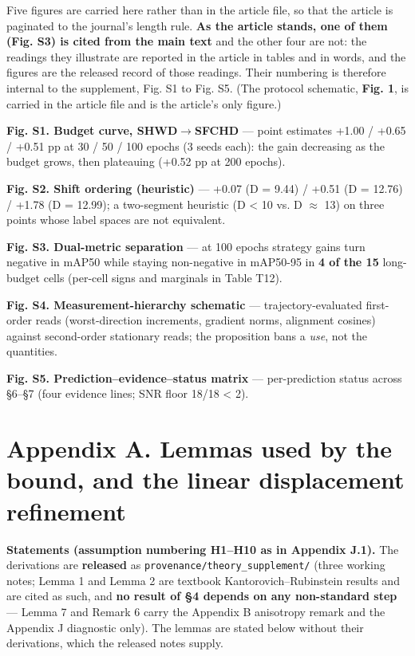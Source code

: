 \documentclass[pdflatex,sn-mathphys-ay]{sn-jnl}
\begin{document}
Five figures are carried here rather than in the article file, so that the article is paginated to the journal's length rule. \textbf{As the article stands, one of them (Fig. S3) is cited from the main text} and the other four are not: the readings they illustrate are reported in the article in tables and in words, and the figures are the released record of those readings. Their numbering is therefore internal to the supplement, Fig. S1 to Fig. S5. (The protocol schematic, \textbf{Fig. 1}, is carried in the article file and is the article's only figure.)

\textbf{Fig. S1. Budget curve, SHWD\ensuremath{\rightarrow}SFCHD} --- point estimates +1.00 / +0.65 / +0.51 pp at 30 / 50 / 100 epochs (3 seeds each): the gain decreasing as the budget grows, then plateauing (+0.52 pp at 200 epochs).

\textbf{Fig. S2. Shift ordering (heuristic)} --- +0.07 (D = 9.44) / +0.51 (D = 12.76) / +1.78 (D = 12.99); a two-segment heuristic (D \textless{} 10 vs. D \ensuremath{\approx} 13) on three points whose label spaces are not equivalent.

\textbf{Fig. S3. Dual-metric separation} --- at 100 epochs strategy gains turn negative in mAP50 while staying non-negative in mAP50-95 in \textbf{4 of the 15} long-budget cells (per-cell signs and marginals in Table T12).

\textbf{Fig. S4. Measurement-hierarchy schematic} --- trajectory-evaluated first-order reads (worst-direction increments, gradient norms, alignment cosines) against second-order stationary reads; the proposition bans a \emph{use}, not the quantities.

\textbf{Fig. S5. Prediction--evidence--status matrix} --- per-prediction status across \S{}6--\S{}7 (four evidence lines; SNR floor 18/18 \textless{} 2).

\section*{Appendix A. Lemmas used by the bound, and the linear displacement refinement}

\textbf{Statements (assumption numbering H1--H10 as in Appendix J.1).} The derivations are \textbf{released} as \texttt{provenance/theory\_supplement/} (three working notes; Lemma 1 and Lemma 2 are textbook Kantorovich--Rubinstein results and are cited as such, and \textbf{no result of \S{}4 depends on any non-standard step} --- Lemma 7 and Remark 6 carry the Appendix B anisotropy remark and the Appendix J diagnostic only). The lemmas are stated below without their derivations, which the released notes supply.
\end{document}
